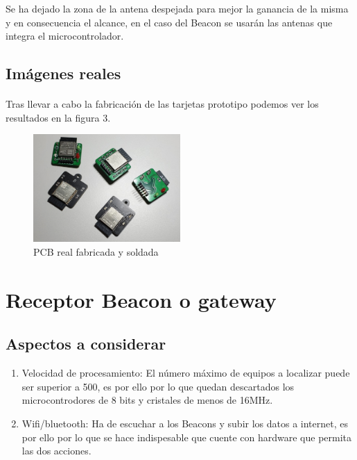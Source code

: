 \documentclass[paper=a4, fontsize=11pt,twoside]{scrartcl}	%
\begin{document}
        Se ha dejado la zona de la antena despejada para mejor la ganancia de la misma y en consecuencia el alcance, en el caso 
        del Beacon se usarán las antenas que integra el microcontrolador.
    \subsection{Imágenes reales}
        \paragraph{}
        Tras llevar a cabo la fabricación de las tarjetas prototipo podemos ver los resultados en la figura 3.
        \begin{center}
            \begin{figure}[ht]
                \centering
                \includegraphics[width=0.5\textwidth]{../real_beacon_pcb.jpeg}
                \caption{PCB real fabricada y soldada}
                \label{fig:mesh3}
            \end{figure}    
        \end{center}       
\section{Receptor Beacon o gateway}
    \subsection{Aspectos a considerar}
        \begin{enumerate}
            \item Velocidad de procesamiento: El número máximo de equipos a localizar puede ser superior a 500, es por ello 
            por lo que quedan descartados los microcontrodores de 8 bits y cristales de menos de 16MHz.
            \item Wifi/bluetooth: Ha de escuchar a los Beacons y subir los datos a internet, es por ello por lo que se hace 
            indispesable que cuente con hardware que permita las dos acciones.
        \end{enumerate}
\end{document}
